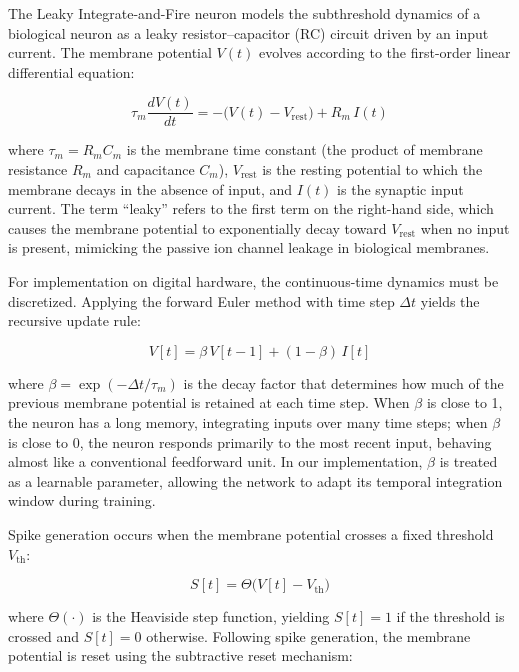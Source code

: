 The Leaky Integrate-and-Fire neuron models the subthreshold dynamics of a biological neuron as a leaky resistor--capacitor (RC) circuit driven by an input current. The membrane potential $V(t)$ evolves according to the first-order linear differential equation:

\begin{equation}
\tau_m \frac{dV(t)}{dt} = -\bigl(V(t) - V_{\text{rest}}\bigr) + R_m \, I(t)
\label{eq:snn-lif-continuous}
\end{equation}

where $\tau_m = R_m C_m$ is the membrane time constant (the product of membrane resistance $R_m$ and capacitance $C_m$), $V_{\text{rest}}$ is the resting potential to which the membrane decays in the absence of input, and $I(t)$ is the synaptic input current. The term ``leaky'' refers to the first term on the right-hand side, which causes the membrane potential to exponentially decay toward $V_{\text{rest}}$ when no input is present, mimicking the passive ion channel leakage in biological membranes.

For implementation on digital hardware, the continuous-time dynamics must be discretized. Applying the forward Euler method with time step $\Delta t$ yields the recursive update rule:

\begin{equation}
V[t] = \beta \, V[t-1] + (1 - \beta) \, I[t]
\label{eq:snn-lif-discrete}
\end{equation}

where $\beta = \exp(-\Delta t / \tau_m)$ is the decay factor that determines how much of the previous membrane potential is retained at each time step. When $\beta$ is close to 1, the neuron has a long memory, integrating inputs over many time steps; when $\beta$ is close to 0, the neuron responds primarily to the most recent input, behaving almost like a conventional feedforward unit. In our implementation, $\beta$ is treated as a learnable parameter, allowing the network to adapt its temporal integration window during training.

Spike generation occurs when the membrane potential crosses a fixed threshold $V_{\text{th}}$:

\begin{equation}
S[t] = \Theta\bigl(V[t] - V_{\text{th}}\bigr)
\label{eq:snn-spike-gen}
\end{equation}

where $\Theta(\cdot)$ is the Heaviside step function, yielding $S[t] = 1$ if the threshold is crossed and $S[t] = 0$ otherwise. Following spike generation, the membrane potential is reset using the subtractive reset mechanism:

